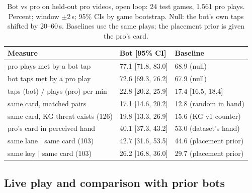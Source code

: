 \documentclass[conference]{IEEEtran}
\begin{document}
\begin{table}[t]
\caption{Bot vs pro on held-out pro videos, open loop: 24 test games, 1,561 pro plays. Percent; window $\pm$2\,s; 95\% CIs by game bootstrap. Null: the bot's own taps shifted by 20--60\,s. Baselines use the same plays; the placement prior is given the pro's card.}
\label{tab:vspro}
\centering\scriptsize
\setlength{\tabcolsep}{3pt}
\begin{tabular}{@{}lll@{}}
\toprule
Measure & Bot [95\% CI] & Baseline\\
\midrule
pro plays met by a bot tap & 77.1 [71.8, 83.0] & 68.9 (null)\\
bot taps met by a pro play & 72.6 [69.3, 76.2] & 67.9 (null)\\
taps (bot) / plays (pro) per min & 22.8 [20.2, 25.9] & 17.4 [16.5, 18.4]\\
same card, matched pairs & 17.1 [14.6, 20.2] & 12.8 (random in hand)\\
same card, KG threat exists (126) & 19.8 [13.3, 26.9] & 15.6 (KG v1 counter)\\
pro's card in perceived hand & 40.1 [37.3, 43.2] & 53.0 (dataset's hand)\\
same lane $\mid$ same card (103) & 42.7 [31.6, 53.5] & 44.6 (placement prior)\\
same key $\mid$ same card (103) & 26.2 [16.8, 36.0] & 29.7 (placement prior)\\
\bottomrule
\end{tabular}
\end{table}

\subsection{Live play and comparison with prior bots}
\label{sec:live}
\end{document}

